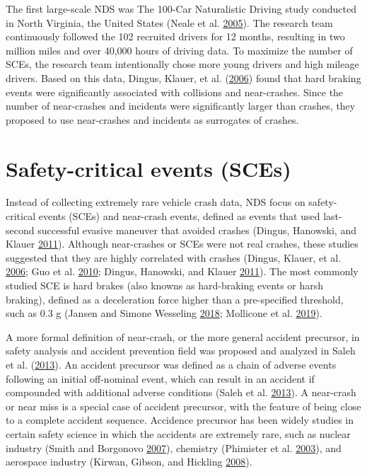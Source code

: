 \documentclass[12pt]{book}
\numberwithin{equation}{chapter}
\begin{document}
The first large-scale NDS was The 100-Car Naturalistic Driving study conducted in North Virginia, the United States (Neale et al. \protect\hyperlink{ref-neale2005overview}{2005}). The research team continuously followed the 102 recruited drivers for 12 months, resulting in two million miles and over 40,000 hours of driving data. To maximize the number of SCEs, the research team intentionally chose more young drivers and high mileage drivers. Based on this data, Dingus, Klauer, et al. (\protect\hyperlink{ref-dingus2006100}{2006}) found that hard braking events were significantly associated with collisions and near-crashes. Since the number of near-crashes and incidents were significantly larger than crashes, they proposed to use near-crashes and incidents as surrogates of crashes.

\hypertarget{safety-critical-events-sces}{%
\section{Safety-critical events (SCEs)}\label{safety-critical-events-sces}}

Instead of collecting extremely rare vehicle crash data, NDS focus on safety-critical events (SCEs) and near-crash events, defined as events that used last-second successful evasive maneuver that avoided crashes (Dingus, Hanowski, and Klauer \protect\hyperlink{ref-dingus2011estimating}{2011}). Although near-crashes or SCEs were not real crashes, these studies suggested that they are highly correlated with crashes (Dingus, Klauer, et al. \protect\hyperlink{ref-dingus2006100}{2006}; Guo et al. \protect\hyperlink{ref-guo2010near}{2010}; Dingus, Hanowski, and Klauer \protect\hyperlink{ref-dingus2011estimating}{2011}). The most commonly studied SCE is hard brakes (also knowns as hard-braking events or harsh braking), defined as a deceleration force higher than a pre-specified threshold, such as 0.3 g (Jansen and Simone Wesseling \protect\hyperlink{ref-jansen2018harsh}{2018}; Mollicone et al. \protect\hyperlink{ref-mollicone2019predicting}{2019}).

A more formal definition of near-crash, or the more general accident precursor, in safety analysis and accident prevention field was proposed and analyzed in Saleh et al. (\protect\hyperlink{ref-saleh2013accident}{2013}). An accident precursor was defined as a chain of adverse events following an initial off-nominal event, which can result in an accident if compounded with additional adverse conditions (Saleh et al. \protect\hyperlink{ref-saleh2013accident}{2013}). A near-crash or near miss is a special case of accident precursor, with the feature of being close to a complete accident sequence. Accidence precursor has been widely studies in certain safety science in which the accidents are extremely rare, such as nuclear industry (Smith and Borgonovo \protect\hyperlink{ref-smith2007decision}{2007}), chemistry (Phimister et al. \protect\hyperlink{ref-phimister2003near}{2003}), and aerospace industry (Kirwan, Gibson, and Hickling \protect\hyperlink{ref-kirwan2008human}{2008}).
\end{document}
